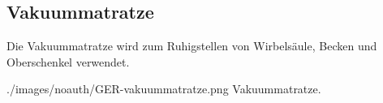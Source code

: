 \subsection{Vakuummatratze}
\label{topic:vakuummatratze-beschreibung}

{
Die Vakuummatratze wird zum Ruhigstellen von Wirbelsäule, Becken und
Oberschenkel verwendet. 

{\TakeNotesLarge}
}{

}
{./images/noauth/GER-vakuummatratze.png}
{Vakuummatratze.}
{}





\nocite{RueckerBildatlas1}